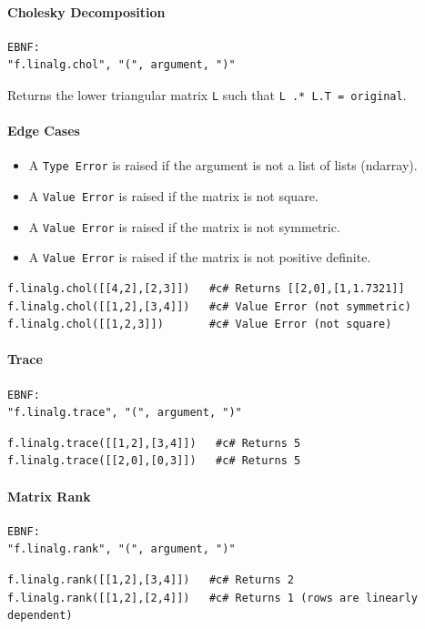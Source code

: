 \paragraph{Cholesky Decomposition}
\begin{verbatim}
EBNF:
"f.linalg.chol", "(", argument, ")"
\end{verbatim}
Returns the lower triangular matrix \texttt{L} such that \texttt{L .* L.T = original}. \\

\paragraph{Edge Cases}
\begin{itemize}
\item A \texttt{Type Error} is raised if the argument is not a list of lists (ndarray).
\item A \texttt{Value Error} is raised if the matrix is not square.
\item A \texttt{Value Error} is raised if the matrix is not symmetric.
\item A \texttt{Value Error} is raised if the matrix is not positive definite.
\end{itemize}

\begin{verbatim}
f.linalg.chol([[4,2],[2,3]])   #c# Returns [[2,0],[1,1.7321]]
f.linalg.chol([[1,2],[3,4]])   #c# Value Error (not symmetric)
f.linalg.chol([[1,2,3]])       #c# Value Error (not square)
\end{verbatim}

\paragraph{Trace}
\begin{verbatim}
EBNF:
"f.linalg.trace", "(", argument, ")"
\end{verbatim}
\begin{verbatim}
f.linalg.trace([[1,2],[3,4]])   #c# Returns 5
f.linalg.trace([[2,0],[0,3]])   #c# Returns 5
\end{verbatim}

\paragraph{Matrix Rank}
\begin{verbatim}
EBNF:
"f.linalg.rank", "(", argument, ")"
\end{verbatim}
\begin{verbatim}
f.linalg.rank([[1,2],[3,4]])   #c# Returns 2
f.linalg.rank([[1,2],[2,4]])   #c# Returns 1 (rows are linearly dependent)
\end{verbatim}

